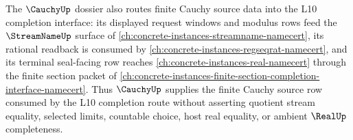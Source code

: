 The $\CauchyUp$ dossier also routes finite Cauchy source data into the L10 completion interface: its displayed request windows and modulus rows feed the $\StreamNameUp$ surface of \autoref{ch:concrete-instances-streamname-namecert}, its rational readback is consumed by \autoref{ch:concrete-instances-regseqrat-namecert}, and its terminal seal-facing row reaches \autoref{ch:concrete-instances-real-namecert} through the finite section packet of \autoref{ch:concrete-instances-finite-section-completion-interface-namecert}. Thus $\CauchyUp$ supplies the finite Cauchy source row consumed by the L10 completion route without asserting quotient stream equality, selected limits, countable choice, host real equality, or ambient $\RealUp$ completeness.
